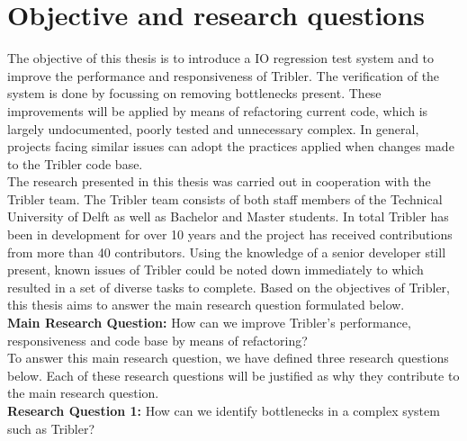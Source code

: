 
\section{Objective and research questions}
\label{chp2:sct:objectives-research-questions}
The objective of this thesis is to introduce a IO regression test system and to improve the performance and responsiveness of Tribler.
The verification of the system is done by focussing on removing bottlenecks present.
These improvements will be applied by means of refactoring current code, which is largely undocumented, poorly tested and unnecessary complex.
In general, projects facing similar issues can adopt the practices applied when changes made to the Tribler code base.\\

The research presented in this thesis was carried out in cooperation with the Tribler team. 
The Tribler team consists of both staff members of the Technical University of Delft as well as Bachelor and Master students.
In total Tribler has been in development for over 10 years and the project has received contributions from more than 40 contributors.
Using the knowledge of a senior developer still present, known issues of Tribler could be noted down immediately to which resulted in a set of diverse tasks to complete.
Based on the objectives of Tribler, this thesis aims to answer the main research question formulated below.\\

\textbf{Main Research Question:} How can we improve Tribler's performance, responsiveness and code base by means of refactoring?\\

To answer this main research question, we have defined three research questions below. Each of these research questions will be justified as why they contribute to the main research question.\\

\textbf{Research Question 1:} How can we identify bottlenecks in a complex system such as Tribler?\\

